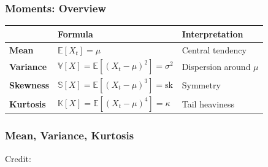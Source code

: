 \documentclass{beamer}
\begin{document}
\begin{frame}
  \frametitle{Moments: Overview}
  \begin{table}
    \centering
    \begin{tabular}{lll}
      \hline
      \hline
      & Formula & Interpretation \\
      \hline
      \textbf{Mean} & $\mathbb{E}[X_t] = \mu$ & Central tendency\\
      \textbf{Variance} & $\mathbb{V}[X] = \mathbb{E}\left[(X_t - \mu)^2\right] = \sigma^2$ & Dispersion around $\mu$\\
      \textbf{Skewness} & $\mathbb{S}[X] = \mathbb{E}\left[(X_t - \mu)^3\right] = \text{sk}$ & Symmetry\\
      \textbf{Kurtosis} & $\mathbb{K}[X] = \mathbb{E}\left[(X_t - \mu)^4\right] = \kappa$ & Tail heaviness\\
      \hline
      \hline                                                                                            
    \end{tabular}
  \end{table}
\end{frame}


\begin{frame}
  \frametitle{Mean, Variance, Kurtosis}
  \hspace*{15pt}\hbox{\scriptsize Credit:}
\end{frame}
\end{document}
